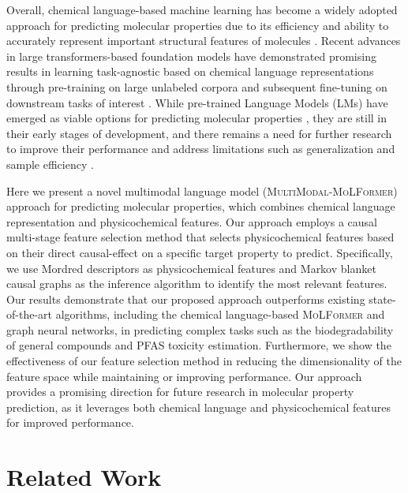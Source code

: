\documentclass{article}
\begin{document}
Overall, chemical language-based machine learning has become a widely adopted approach for predicting molecular properties due to its efficiency and ability to accurately represent important structural features of molecules \cite{wigh2022review}. 
Recent advances in large transformers-based foundation models have demonstrated promising results in learning task-agnostic based on chemical language representations through pre-training on large unlabeled corpora and subsequent fine-tuning on downstream tasks of interest \cite{schwaller2019molecular, ross2022large}.
While pre-trained Language Models (LMs) have emerged as viable options for predicting molecular properties \cite{liu2023molrope, ross2022large, skinnider2021chemical}, they are still in their early stages of development, and there remains a need for further research to improve their performance and address limitations such as generalization and sample efficiency \cite{wang2019smiles,moret2022perplexity}.

Here we present a novel multimodal language model (\textsc{MultiModal}-\textsc{MoLFormer}) approach for predicting molecular properties, which combines chemical language representation and physicochemical features. 
Our approach employs a causal multi-stage feature selection method that selects physicochemical features based on their direct causal-effect on a specific target property to predict. 
Specifically, we use Mordred descriptors as physicochemical features and Markov blanket causal graphs as the inference algorithm to identify the most relevant features. 
Our results demonstrate that our proposed approach outperforms existing state-of-the-art algorithms, including the chemical language-based \textsc{MoLFormer} and graph neural networks, in predicting complex tasks such as the biodegradability of general compounds and PFAS toxicity estimation. 
Furthermore, we show the effectiveness of our feature selection method in reducing the dimensionality of the feature space while maintaining or improving performance.
Our approach provides a promising direction for future research in molecular property prediction, as it leverages both chemical language and physicochemical features for improved performance.

\section{Related Work}
\end{document}
